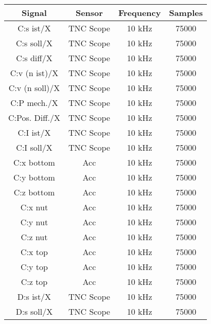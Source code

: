 \begin{center}
\begin{longtable}{c c c c} 
 \toprule
 Signal & Sensor & Frequency & Samples \\ [0.5ex] 
 \midrule
 C:s ist/X & TNC Scope & 10 kHz & 75000 \\ 

 C:s soll/X & TNC Scope & 10 kHz & 75000 \\ 

 C:s diff/X & TNC Scope & 10 kHz & 75000 \\ 

 C:v (n ist)/X & TNC Scope & 10 kHz & 75000 \\ 

 C:v (n soll)/X& TNC Scope & 10 kHz & 75000 \\ 

 C:P mech./X & TNC Scope & 10 kHz & 75000 \\ 

 C:Pos. Diff./X & TNC Scope & 10 kHz & 75000 \\ 

 C:I ist/X & TNC Scope & 10 kHz & 75000 \\ 

 C:I soll/X & TNC Scope & 10 kHz & 75000 \\ 

 C:x bottom & Acc & 10 kHz & 75000 \\ 

 C:y bottom & Acc & 10 kHz & 75000 \\ 

 C:z bottom & Acc & 10 kHz & 75000 \\ 

 C:x nut & Acc & 10 kHz & 75000 \\ 

 C:y nut & Acc & 10 kHz & 75000 \\ 

 C:z nut & Acc & 10 kHz & 75000 \\ 

 C:x top & Acc & 10 kHz & 75000 \\ 

 C:y top & Acc & 10 kHz & 75000 \\ 

 C:z top & Acc & 10 kHz & 75000 \\ 

 D:s ist/X & TNC Scope & 10 kHz & 75000 \\

 D:s soll/X & TNC Scope & 10 kHz & 75000 \\ 


\end{longtable}
\end{center}
